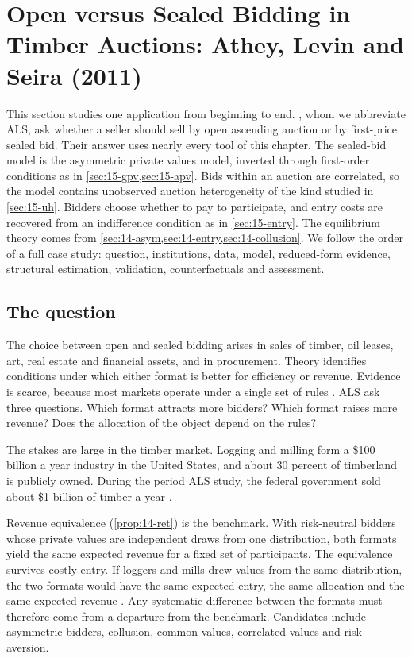 \section{Open versus Sealed Bidding in Timber Auctions: Athey, Levin and Seira (2011)}\label{sec:15-als}

This section studies one application from beginning to end. \citet{AtheyLevinSeira2011}, whom we
abbreviate ALS, ask whether a seller should sell by open ascending auction or by first-price sealed
bid. Their answer uses nearly every tool of this chapter. The sealed-bid model is the asymmetric
private values model, inverted through first-order conditions as in \cref{sec:15-gpv,sec:15-apv}.
Bids within an auction are correlated, so the model contains unobserved auction heterogeneity of the
kind studied in \cref{sec:15-uh}. Bidders choose whether to pay to participate, and entry costs are
recovered from an indifference condition as in \cref{sec:15-entry}. The equilibrium theory comes from
\cref{sec:14-asym,sec:14-entry,sec:14-collusion}. We follow the order of a full case study: question,
institutions, data, model, reduced-form evidence, structural estimation, validation, counterfactuals
and assessment.

\subsection{The question}\label{sec:15-als-question}

The choice between open and sealed bidding arises in sales of timber, oil leases, art, real estate and
financial assets, and in procurement. Theory identifies conditions under which either format is better
for efficiency or revenue. Evidence is scarce, because most markets operate under a single set of rules
\citep[p.~207]{AtheyLevinSeira2011}. ALS ask three questions. Which format attracts more bidders? Which
format raises more revenue? Does the allocation of the object depend on the rules?

The stakes are large in the timber market. Logging and milling form a \$100 billion a year industry in
the United States, and about 30 percent of timberland is publicly owned. During the period ALS study,
the federal government sold about \$1 billion of timber a year \citep[p.~208]{AtheyLevinSeira2011}.

Revenue equivalence (\cref{prop:14-ret}) is the benchmark. With risk-neutral bidders whose private
values are independent draws from one distribution, both formats yield the same expected revenue for a
fixed set of participants. The equivalence survives costly entry. If loggers and mills drew values from
the same distribution, the two formats would have the same expected entry, the same allocation and the
same expected revenue \citep[Section II.D]{AtheyLevinSeira2011}. Any systematic difference between the
formats must therefore come from a departure from the benchmark. Candidates include asymmetric bidders,
collusion, common values, correlated values and risk aversion.

